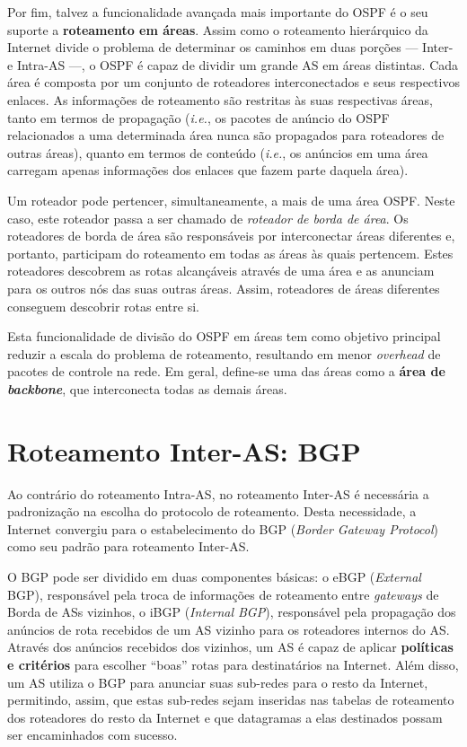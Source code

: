 \documentclass{article}
\begin{document}
Por fim, talvez a funcionalidade avançada mais importante do OSPF é o seu suporte a \textbf{roteamento em áreas}. Assim como o roteamento hierárquico da Internet divide o problema de determinar os caminhos em duas porções --- Inter- e Intra-AS ---, o OSPF é capaz de dividir um grande AS em áreas distintas. Cada área é composta por um conjunto de roteadores interconectados e seus respectivos enlaces. As informações de roteamento são restritas às suas respectivas áreas, tanto em termos de propagação (\textit{i.e.}, os pacotes de anúncio do OSPF relacionados a uma determinada área nunca são propagados para roteadores de outras áreas), quanto em termos de conteúdo (\textit{i.e.}, os anúncios em uma área carregam apenas informações dos enlaces que fazem parte daquela área).

Um roteador pode pertencer, simultaneamente, a mais de uma área OSPF. Neste caso, este roteador passa a ser chamado de \textit{roteador de borda de área}. Os roteadores de borda de área são responsáveis por interconectar áreas diferentes e, portanto, participam do roteamento em todas as áreas às quais pertencem. Estes roteadores descobrem as rotas alcançáveis através de uma área e as anunciam para os outros nós das suas outras áreas. Assim, roteadores de áreas diferentes conseguem descobrir rotas entre si.

Esta funcionalidade de divisão do OSPF em áreas tem como objetivo principal reduzir a escala do problema de roteamento, resultando em menor \textit{overhead} de pacotes de controle na rede. Em geral, define-se uma das áreas como a \textbf{área de \textit{backbone}}, que interconecta todas as demais áreas.

\section{Roteamento Inter-AS: BGP}

Ao contrário do roteamento Intra-AS, no roteamento Inter-AS é necessária a padronização na escolha do protocolo de roteamento. Desta necessidade, a Internet convergiu para o estabelecimento do BGP (\textit{Border Gateway Protocol}) como seu padrão para roteamento Inter-AS.

O BGP pode ser dividido em duas componentes básicas: o eBGP (\textit{External} BGP), responsável pela troca de informações de roteamento entre \textit{gateways} de Borda de ASs vizinhos, o iBGP (\textit{Internal BGP}), responsável pela propagação dos anúncios de rota recebidos de um AS vizinho para os roteadores internos do AS. Através dos anúncios recebidos dos vizinhos, um AS é capaz de aplicar \textbf{políticas e critérios} para escolher ``boas'' rotas para destinatários na Internet. Além disso, um AS utiliza o BGP para anunciar suas sub-redes para o resto da Internet, permitindo, assim, que estas sub-redes sejam inseridas nas tabelas de roteamento dos roteadores do resto da Internet e que datagramas a elas destinados possam ser encaminhados com sucesso.
\end{document}
